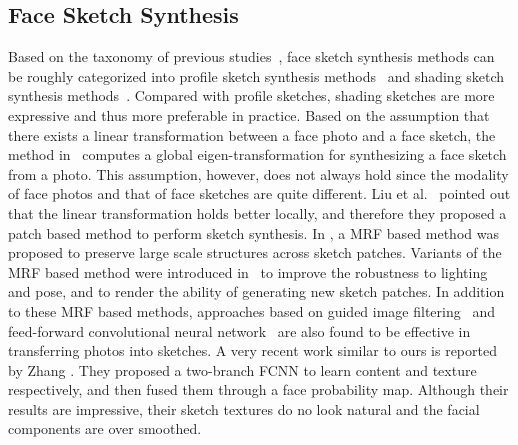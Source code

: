 \documentclass[10pt,twocolumn,letterpaper]{article}
\begin{document}
\subsection{Face Sketch Synthesis}
Based on the taxonomy of previous studies~\cite{song2014real,zhou2012markov}, face sketch synthesis methods can be roughly categorized into profile sketch synthesis methods~\cite{berger2013style,chen2001example,xu2008hierarchical} and shading sketch synthesis methods~\cite{liu2005nonlinear,song2014real,tang2003face,wang2009face,zhang2015end,zhang2010lighting,zhou2012markov}. Compared with profile sketches, shading sketches are more expressive and thus more preferable in practice. Based on the assumption that there exists a linear transformation between a face photo and a face sketch, the method in~\cite{tang2003face} computes a global eigen-transformation for synthesizing a face sketch from a photo. This assumption, however, does not always hold since the modality of face photos and that of face sketches are quite different. Liu et al.~\cite{liu2005nonlinear} pointed out that the linear transformation holds better locally, and therefore they proposed a patch based method to perform sketch synthesis. In \cite{wang2009face}, a MRF based method was proposed to preserve large scale structures across sketch patches. Variants of the MRF based method were introduced in~\cite{zhang2010lighting,zhou2012markov} to improve the robustness to lighting and pose, and to render the ability of generating new sketch patches. In addition to these MRF based methods, approaches based on guided image filtering~\cite{song2014real} and feed-forward convolutional neural network~\cite{zhang2015end} are also found to be effective in transferring photos into sketches. A very recent work similar to ours is reported by Zhang \etal \cite{zhang2017content}. They proposed a two-branch FCNN to learn content and texture respectively, and then fused them through a face probability map. Although their results are impressive, their sketch textures do no look natural and the facial components are over smoothed.

\end{document}
